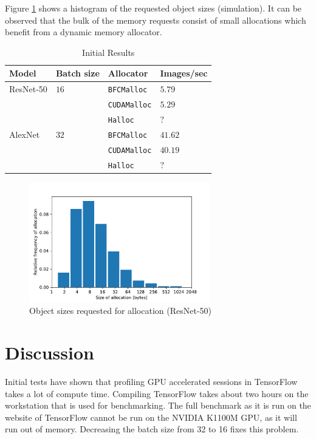 \documentclass[12pt,twoside]{article}
\newcommand{\resnettimebfc}{$5.79$}     %
\newcommand{\resnettimecuda}{$5.29$}    %
\newcommand{\resnettimehalloc}{$?$}     %
\newcommand{\alexnettimebfc}{$41.62$}   %
\newcommand{\alexnettimecuda}{$40.19$}  %
\newcommand{\alexnettimehalloc}{$?$}    %
\begin{document}
Figure \ref{fig:hist} shows a histogram of the requested object sizes (simulation). It can be observed that the bulk of the memory requests consist of small allocations which benefit from a dynamic memory allocator.

\begin{table}[!ht]
\centering
\caption{Initial Results}
\label{tab:results}
\begin{tabular}{|l|l|l|l|}
\hline
Model     & Batch size  & Allocator          & Images/sec         \\ \hline
ResNet-50 & $16$        & \texttt{BFCMalloc} & \resnettimebfc     \\ \cline{3-4} 
          &             & \texttt{CUDAMalloc}  & \resnettimecuda    \\ \cline{3-4} 
          &             & \texttt{Halloc}    & \resnettimehalloc  \\ \hline
AlexNet   & $32$        & \texttt{BFCMalloc} & \alexnettimebfc    \\ \cline{3-4} 
          &             & \texttt{CUDAMalloc}  & \alexnettimecuda   \\ \cline{3-4} 
          &             & \texttt{Halloc}    & \alexnettimehalloc \\ \hline
\end{tabular}
\end{table}

\begin{figure}[!ht]
  \centering
    \includegraphics[width=0.7\textwidth]{../Quantitative Python/histogram.pdf}
  \caption{Object sizes requested for allocation (ResNet-50)}
  \label{fig:hist}
\end{figure}

\section{Discussion}
\label{sec:discussion}
Initial tests have shown that profiling GPU accelerated sessions in TensorFlow takes a lot of compute time. Compiling TensorFlow takes about two hours on the workstation that is used for benchmarking. The full benchmark as it is run on the website of TensorFlow cannot be run on the NVIDIA K1100M GPU, as it will run out of memory. Decreasing the batch size from 32 to 16 fixes this problem.
\end{document}
